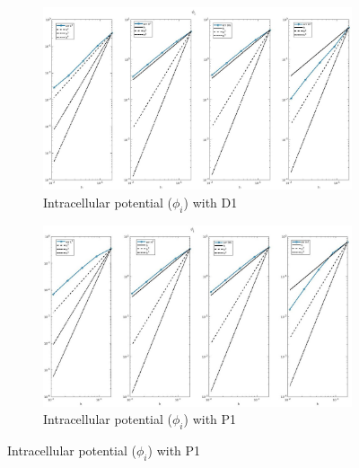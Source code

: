 \documentclass[a4paper,11pt]{article}
\begin{document}
\begin{figure}[H]
\caption{Comparison of the intracellular potential  ($\phi_i$)}
\label{phii_1}
\begin{subfigure}{\textwidth}
\begin{center}
\includegraphics[width = \textwidth]{./D1_Phii_1.jpg}
\caption{Intracellular potential ($\phi_i$) with D1}
\end{center}
\end{subfigure}
\begin{subfigure}{\textwidth}
\begin{center}
\includegraphics[width =\textwidth]{./P1_Phii_1.jpg}
\caption{Intracellular potential ($\phi_i$) with P1}
\end{center}
\end{subfigure}
\end{figure}
\newpage
\end{document}
